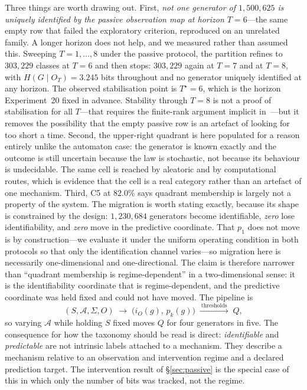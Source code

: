 \documentclass[11pt]{article}
\begin{document}
Three things are worth drawing out. First, \emph{not one generator of $1{,}500{,}625$ is
uniquely identified by the passive observation map at horizon $T=6$}---the same empty row
that failed the exploratory criterion, reproduced on an unrelated family. A longer horizon does not help, and we
measured rather than assumed this. Sweeping $T = 1,\dots,8$ under the passive protocol,
the partition refines to $303{,}229$ classes at $T=6$ and then stops: $303{,}229$ again at
$T=7$ and at $T=8$, with $H(G\mid O_T) = 3.245$ bits throughout and no generator uniquely
identified at any horizon. The observed stabilisation point is $T^\star = 6$, which is the
horizon Experiment~20 fixed in advance. Stability through $T=8$ is not a proof of
stabilisation for all $T$---that requires the finite-rank argument implicit
in~\cite{ito1992}---but it removes the possibility that the empty passive row is an
artefact of looking for too short a time. Second, the upper-right quadrant is
here populated for a reason entirely unlike the automaton case: the generator is known
exactly and the outcome is still uncertain because the law is stochastic, not because its
behaviour is undecidable. The same cell is reached by aleatoric and by computational
routes, which is evidence that the cell is a real category rather than an artefact of one
mechanism. Third, C5 at $82.0\%$ says quadrant membership is largely not a property of the system.
The migration is worth stating exactly, because its shape is constrained by the design:
$1{,}230{,}684$ generators become identifiable, \emph{zero} lose identifiability, and
\emph{zero} move in the predictive coordinate. That $p_1$ does not move is by
construction---we evaluate it under the uniform operating condition in both protocols so
that only the identification channel varies---so migration here is necessarily
one-dimensional and one-directional. The claim is therefore narrower than ``quadrant
membership is regime-dependent'' in a two-dimensional sense: it is the identifiability
coordinate that is regime-dependent, and the predictive coordinate was held fixed and
could not have moved. The pipeline is
\[
  (S, \mathcal{A}, \Sigma, O)
  \;\longrightarrow\;
  \big(i_O(g),\, p_k(g)\big)
  \;\xrightarrow{\ \text{thresholds}\ }\;
  Q ,
\]
so varying $\mathcal{A}$ while holding $S$ fixed moves $Q$ for four generators in five.
The consequence for how the taxonomy should be read is direct: \emph{identifiable} and
\emph{predictable} are not intrinsic labels attached to a mechanism. They describe a
mechanism relative to an observation and intervention regime and a declared prediction
target. The intervention result of \S\ref{sec:passive} is the special case of this in
which only the number of bits was tracked, not the regime.
\end{document}
